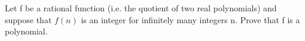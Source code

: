 Let f be a rational function (i.e. the quotient of two real polynomials) and suppose that $f(n)$ is an integer for infinitely many integers n. Prove that f is a polynomial.
